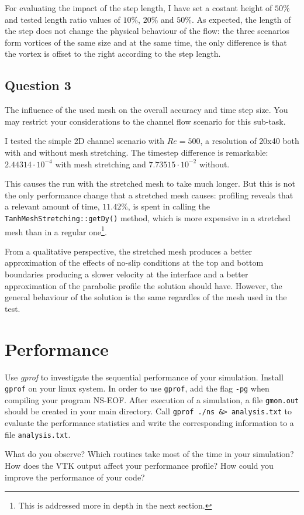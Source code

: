 \documentclass[11pt,a4paper,DIV12,pdftex]{scrartcl}
\begin{document}
For evaluating the impact of the step length, I have set a costant height of $50\%$ and tested length ratio values of $10\%$, $20\%$ and $50\%$. As expected, the length of the step does not change the physical behaviour of the flow: the three scenarios form vortices of the same size and at the same time, the only difference is that the vortex is offset to the right according to the step length.

\subsection{Question 3}
\begin{shaded}
	The influence of the used mesh on the overall accuracy and time step size. You may restrict your considerations to the channel flow scenario for this sub-task.
\end{shaded}

I tested the simple 2D channel scenario with $Re=500$, a resolution of 20x40 both with and without mesh stretching.
The timestep difference is remarkable: $2.44314\cdot10^{-4}$ with mesh stretching and $7.73515\cdot10^{-2}$ without.

This causes the run with the stretched mesh to take much longer.
But this is not the only performance change that a stretched mesh causes: profiling reveals that a relevant amount of time, $11.42\%$, is spent in calling the \verb!TanhMeshStretching::getDy()! method, which is more expensive in a stretched mesh than in a regular one\footnote{This is addressed more in depth in the next section.}.

From a qualitative perspective, the stretched mesh produces a better approximation of the effects of no-slip conditions at the top and bottom boundaries producing a slower velocity at the interface and a better approximation of the parabolic profile the solution should have. However, the general behaviour of the solution is the same regardles of the mesh used in the test.

\section{Performance}
\begin{shaded}
	Use \emph{gprof} to investigate the sequential performance of your simulation. Install \verb!gprof! on your linux system. In order to use \verb!gprof!, add the flag \verb!-pg! when compiling your program NS-EOF. After execution of a simulation, a file \verb!gmon.out! should be created in your main directory. Call \verb!gprof ./ns &> analysis.txt! to evaluate the performance statistics and write the corresponding information to a file \verb!analysis.txt!.

	What do you observe? Which routines take most of the time in your simulation? How does the VTK output affect your performance profile? How could you improve the performance of your code?
\end{shaded}
\end{document}
